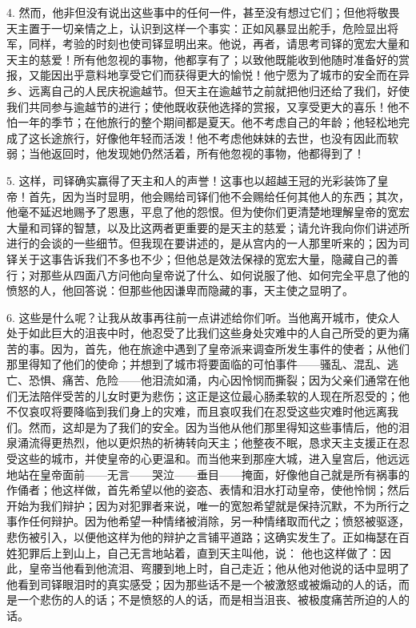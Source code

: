 4. 然而，他非但没有说出这些事中的任何一件，甚至没有想过它们；但他将敬畏天主置于一切亲情之上，认识到这样一个事实：正如风暴显出舵手，危险显出将军，同样，考验的时刻也使司铎显明出来。他说，再者，请思考司铎的宽宏大量和天主的慈爱！所有他忽视的事物，他都享有了；以致他既能收到他随时准备好的赏报，又能因出乎意料地享受它们而获得更大的愉悦！他宁愿为了城市的安全而在异乡、远离自己的人民庆祝逾越节。但天主在逾越节之前就把他归还给了我们，好使我们共同参与逾越节的进行；使他既收获他选择的赏报，又享受更大的喜乐！他不怕一年的季节；在他旅行的整个期间都是夏天。他不考虑自己的年龄；他轻松地完成了这长途旅行，好像他年轻而活泼！他不考虑他妹妹的去世，也没有因此而软弱；当他返回时，他发现她仍然活着，所有他忽视的事物，他都得到了！\par

5. 这样，司铎确实赢得了天主和人的声誉！这事也以超越王冠的光彩装饰了皇帝！首先，因为当时显明，他会赐给司铎们他不会赐给任何其他人的东西；其次，他毫不延迟地赐予了恩惠，平息了他的怨恨。但为使你们更清楚地理解皇帝的宽宏大量和司铎的智慧，以及比这两者更重要的是天主的慈爱；请允许我向你们讲述所进行的会谈的一些细节。但我现在要讲述的，是从宫内的一人那里听来的；因为司铎关于这事告诉我们不多也不少；但他总是效法保禄的宽宏大量，隐藏自己的善行；对那些从四面八方问他向皇帝说了什么、如何说服了他、如何完全平息了他的愤怒的人，他回答说：但那些他因谦卑而隐藏的事，天主使之显明了。\par

6. 这些是什么呢？让我从故事再往前一点讲述给你们听。当他离开城市，使众人处于如此巨大的沮丧中时，他忍受了比我们这些身处灾难中的人自己所受的更为痛苦的事。因为，首先，他在旅途中遇到了皇帝派来调查所发生事件的使者；从他们那里得知了他们的使命；并想到了城市将要面临的可怕事件——骚乱、混乱、逃亡、恐惧、痛苦、危险——他泪流如涌，内心因怜悯而撕裂；因为父亲们通常在他们无法陪伴受苦的儿女时更为悲伤；这正是这位最心肠柔软的人现在所忍受的；他不仅哀叹将要降临到我们身上的灾难，而且哀叹我们在忍受这些灾难时他远离我们。然而，这却是为了我们的安全。因为当他从他们那里得知这些事情后，他的泪泉涌流得更热烈，他以更炽热的祈祷转向天主；他整夜不眠，恳求天主支援正在忍受这些的城市，并使皇帝的心更温和。而当他来到那座大城，进入皇宫后，他远远地站在皇帝面前——无言——哭泣——垂目——掩面，好像他自己就是所有祸事的作俑者；他这样做，首先希望以他的姿态、表情和泪水打动皇帝，使他怜悯；然后开始为我们辩护；因为对犯罪者来说，唯一的宽恕希望就是保持沉默，不为所行之事作任何辩护。因为他希望一种情绪被消除，另一种情绪取而代之；愤怒被驱逐，悲伤被引入，以便他这样为他的辩护之言铺平道路；这确实发生了。正如梅瑟在百姓犯罪后上到山上，自己无言地站着，直到天主叫他，说：  他也这样做了：因此，皇帝当他看到他流泪、弯腰到地上时，自己走近；他从他对他说的话中显明了他看到司铎眼泪时的真实感受；因为那些话不是一个被激怒或被煽动的人的话，而是一个悲伤的人的话；不是愤怒的人的话，而是相当沮丧、被极度痛苦所迫的人的话。\par

